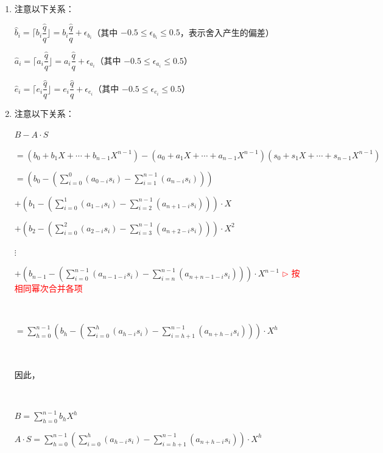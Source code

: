 \begin{enumerate}
\item 注意以下关系：

$\hat{b}_i = \Big\lceil b_i \dfrac{\hat{q}}{q} \Big\rfloor = b_i\dfrac{\hat{q}}{q} + \epsilon_{b_i}$（其中 $-0.5 \le \epsilon_{b_i} \le 0.5$，表示舍入产生的偏差）

$\hat{a}_i = \Big\lceil a_i \dfrac{\hat{q}}{q} \Big\rfloor = a_i\dfrac{\hat{q}}{q} + \epsilon_{a_i}$（其中 $-0.5 \le \epsilon_{a_i} \le 0.5$）

$\hat{e}_i = \Big\lceil e_i \dfrac{\hat{q}}{q} \Big\rfloor = e_i\dfrac{\hat{q}}{q} + \epsilon_{e_i}$（其中 $-0.5 \le \epsilon_{e_i} \le 0.5$）

\item 注意以下关系：


$B - A\cdot S$ 

$ = (b_0 + b_1X + \cdots + b_{n-1}X^{n-1} ) - (a_{0} + a_{1}X + \cdots + a_{n-1}X^{n-1})(s_{0} + s_{1}X + \cdots + s_{n-1}X^{n-1})$ 


$ = \left(b_0 - \left( \sum\limits_{i=0}^{0}(a_{0-i}s_{i}) - \sum\limits_{i=1}^{n-1}(a_{n-i}s_{i}) \right)\right)$

$ + \left(b_1 - \left( \sum\limits_{i=0}^{1}(a_{1-i}s_{i}) - \sum\limits_{i=2}^{n-1}(a_{n+1-i}s_{i})   \right) \right)\cdot X$ 



$ + \left(b_2 - \left( \sum\limits_{i=0}^{2}(a_{2-i}s_{i}) - \sum\limits_{i=3}^{n-1}(a_{n+2-i}s_{i})   \right) \right)\cdot X^2$ 


$\vdots$ 


$ + \left(b_{n-1} - \left(  \sum\limits_{i=0}^{n-1}(a_{n-1-i}s_{i}) -  \sum\limits_{i=n}^{n-1}(a_{n+n-1-i}s_{i})  \right) \right)\cdot X^{n-1}$ \textcolor{red}{ $\rhd$ 按相同幂次合并各项}

$ $

$= \sum\limits_{h=0}^{n-1}  \left(b_h - \left( \sum\limits_{i=0}^{h}(a_{h-i}s_{i}) -  \sum\limits_{i=h+1}^{n-1}(a_{n+h-i}s_{i})  \right) \right)\cdot X^{h}  $

$ $

因此，

$ $

$B = \sum\limits_{h=0}^{n-1}  b_h  X^{h}  $

$A\cdot S = \sum\limits_{h=0}^{n-1}  \left(\sum\limits_{i=0}^{h}(a_{h-i}s_{i}) - \sum\limits_{i=h+1}^{n-1}(a_{n+h-i}s_{i}) \right)\cdot X^{h}  $



\end{enumerate}
